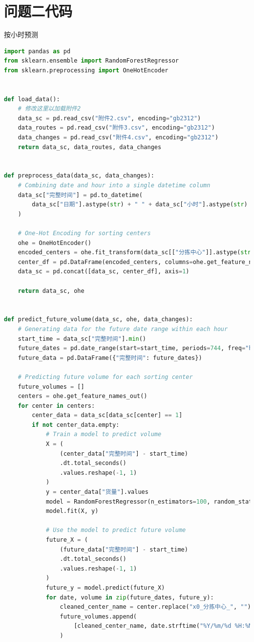 \documentclass[UTF8,a4paper,10 pt]{article}%
\begin{document}
\section{问题二代码}
\noindent 按小时预测
\begin{lstlisting}[language=python]
import pandas as pd
from sklearn.ensemble import RandomForestRegressor
from sklearn.preprocessing import OneHotEncoder


def load_data():
    # 修改这里以加载附件2
    data_sc = pd.read_csv("附件2.csv", encoding="gb2312")
    data_routes = pd.read_csv("附件3.csv", encoding="gb2312")
    data_changes = pd.read_csv("附件4.csv", encoding="gb2312")
    return data_sc, data_routes, data_changes


def preprocess_data(data_sc, data_changes):
    # Combining date and hour into a single datetime column
    data_sc["完整时间"] = pd.to_datetime(
        data_sc["日期"].astype(str) + " " + data_sc["小时"].astype(str) + ":00"
    )

    # One-Hot Encoding for sorting centers
    ohe = OneHotEncoder()
    encoded_centers = ohe.fit_transform(data_sc[["分拣中心"]].astype(str)).toarray()
    center_df = pd.DataFrame(encoded_centers, columns=ohe.get_feature_names_out())
    data_sc = pd.concat([data_sc, center_df], axis=1)

    return data_sc, ohe


def predict_future_volume(data_sc, ohe, data_changes):
    # Generating data for the future date range within each hour
    start_time = data_sc["完整时间"].min()
    future_dates = pd.date_range(start=start_time, periods=744, freq="h")
    future_data = pd.DataFrame({"完整时间": future_dates})

    # Predicting future volume for each sorting center
    future_volumes = []
    centers = ohe.get_feature_names_out()
    for center in centers:
        center_data = data_sc[data_sc[center] == 1]
        if not center_data.empty:
            # Train a model to predict volume
            X = (
                (center_data["完整时间"] - start_time)
                .dt.total_seconds()
                .values.reshape(-1, 1)
            )
            y = center_data["货量"].values
            model = RandomForestRegressor(n_estimators=100, random_state=42)
            model.fit(X, y)

            # Use the model to predict future volume
            future_X = (
                (future_data["完整时间"] - start_time)
                .dt.total_seconds()
                .values.reshape(-1, 1)
            )
            future_y = model.predict(future_X)
            for date, volume in zip(future_dates, future_y):
                cleaned_center_name = center.replace("x0_分拣中心_", "")
                future_volumes.append(
                    [cleaned_center_name, date.strftime("%Y/%m/%d %H:%M"), volume]
                )


\end{lstlisting}
\end{document}
